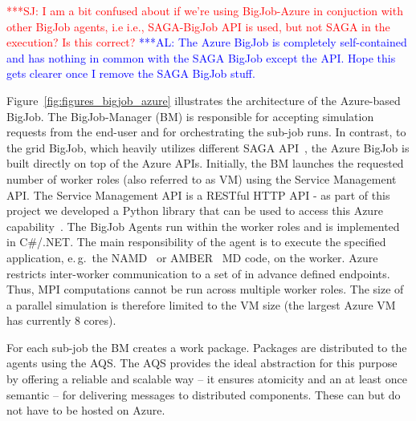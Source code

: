 \documentclass[conference,final]{IEEEtran}
\newcommand{\alnote}[1]{ {\textcolor{blue} { ***AL: #1 }}}
\newcommand{\jhanote}[1]{ {\textcolor{red} { ***SJ: #1 }}}
\newcommand{\alnote}[1]{}
\newcommand{\jhanote}[1]{}
\begin{document}

\jhanote{I am a bit confused about if we're using BigJob-Azure in
  conjuction with other BigJob agents, i.e i.e., SAGA-BigJob API is
  used, but not SAGA in the execution?  Is this correct?}
\alnote{The Azure BigJob is completely self-contained and
has nothing in common with the SAGA BigJob except the API. Hope this gets
clearer once I remove the SAGA BigJob stuff.}

Figure~\ref{fig:figures_bigjob_azure} illustrates the architecture of
the Azure-based BigJob. The BigJob-Manager (BM) is responsible for accepting
simulation requests from the end-user and for orchestrating the
sub-job runs.  In contrast, to the grid BigJob, which heavily utilizes
different SAGA API~\cite{saga_url}, the Azure BigJob is built directly 
on top of the Azure APIs. Initially, the BM launches the requested number
of worker roles (also referred to as VM) using the Service
Management API.  The Service Management API is a RESTful HTTP API - as
part of this project we developed a Python library that can be used to
access this Azure capability~\cite{azure-service-python}. The BigJob
Agents run within the worker roles and is
implemented in C\#/.NET. The main responsibility of the agent is
to execute the specified application, e.\,g.\ the
NAMD~\cite{Phillips:2005gd} or AMBER~\cite{cheatham-5} MD code,
on the worker. Azure restricts inter-worker communication to 
a set of in advance defined endpoints. Thus, MPI computations 
cannot be run across multiple worker roles. The size of 
a parallel simulation is therefore limited to the VM size
(the largest Azure VM has currently 8 cores). 


For each sub-job the BM creates a work package. Packages are distributed
to the agents using the AQS. The AQS provides 
the ideal abstraction for this purpose by offering a reliable and scalable 
way -- it ensures atomicity and an at least once 
semantic -- for delivering messages to distributed components. These can but do not
have to be hosted on Azure. 
\end{document}
